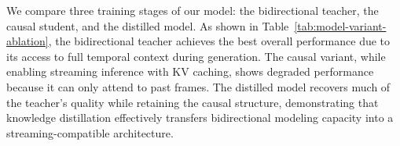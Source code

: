 \documentclass{llmxive}
\begin{document}
We compare three training stages of our model: the bidirectional teacher, the causal student, and the distilled model.
As shown in Table~\ref{tab:model-variant-ablation}, the bidirectional teacher achieves the best overall performance due to its access to full temporal context during generation.
The causal variant, while enabling streaming inference with KV caching, shows degraded performance because it can only attend to past frames.
The distilled model recovers much of the teacher's quality while retaining the causal structure, demonstrating that knowledge distillation effectively transfers bidirectional modeling capacity into a streaming-compatible architecture.



{
\small


}
\end{document}
